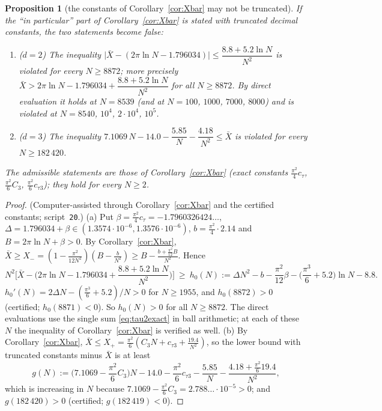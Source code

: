\documentclass[11pt,a4paper]{article}
\newcommand{\Xb}{\bar X}
\theoremstyle{plain}
\newtheorem{proposition}[theorem]{Proposition}
\theoremstyle{definition}
\numberwithin{equation}{section}
\begin{document}
\begin{proposition}[the constants of Corollary~\ref{cor:Xbar} may not be truncated]\label{prop:roundedfalse}
If the ``in particular'' part of Corollary~\ref{cor:Xbar} is stated with truncated decimal constants, the two statements become false:
\begin{enumerate}
\item[(a)] ($d=2$) The inequality $\big|\Xb-(2\pi\ln N-1.796034)\big|\le\dfrac{8.8+5.2\ln N}{N^2}$ is violated for every $N\ge8872$; more precisely
$\Xb>2\pi\ln N-1.796034+\dfrac{8.8+5.2\ln N}{N^2}$ for all $N\ge8872$. By direct evaluation it holds at $N=8539$ (and at $N=100$, $1000$, $7000$, $8000$) and is violated at $N=8540$, $10^4$, $2\cdot10^4$, $10^5$.
\item[(b)] ($d=3$) The inequality $7.1069\,N-14.0-\dfrac{5.85}{N}-\dfrac{4.18}{N^2}\le\Xb$ is violated for every $N\ge182\,420$.
\end{enumerate}
The admissible statements are those of Corollary~\ref{cor:Xbar} (exact constants $\frac{\pi^2}4c_\tau$, $\frac{\pi^2}{6}C_3$, $\frac{\pi^2}6c_{\tau3}$); they hold for every $N\ge2$.
\end{proposition}
\begin{proof}
(Computer-assisted through Corollary~\ref{cor:Xbar} and the certified constants; script~\texttt{20}.)
(a) Put $\beta=\frac{\pi^2}{4}c_\tau=-1.7960326424\ldots$, $\Delta=1.796034+\beta\in(1.3574\cdot10^{-6},1.3576\cdot10^{-6})$, $b=\frac{\pi^2}4\cdot2.14$ and $B=2\pi\ln N+\beta>0$. By Corollary~\ref{cor:Xbar}, $\Xb\ge X_-=(1-\frac{\pi^2}{12N^2})(B-\frac b{N^2})\ge B-\frac{b+\frac{\pi^2}{12}B}{N^2}$. Hence
\[
N^2\Big[\Xb-\Big(2\pi\ln N-1.796034+\frac{8.8+5.2\ln N}{N^2}\Big)\Big]\ \ge\ h_0(N):=\Delta N^2-b-\frac{\pi^2}{12}\beta-\Big(\frac{\pi^3}6+5.2\Big)\ln N-8.8 .
\]
$h_0'(N)=2\Delta N-(\frac{\pi^3}6+5.2)/N>0$ for $N\ge1955$, and $h_0(8872)>0$ (certified; $h_0(8871)<0$). So $h_0(N)>0$ for all $N\ge8872$. The direct evaluations use the single sum \eqref{eq:tau2exact} in ball arithmetic; at each of these $N$ the inequality of Corollary~\ref{cor:Xbar} is verified as well.
(b) By Corollary~\ref{cor:Xbar}, $\Xb\le X_+=\frac{\pi^2}{6}(C_3N+c_{\tau3}+\frac{19.4}{N^2})$, so the lower bound with truncated constants minus $\Xb$ is at least
\[
g(N):=\Big(7.1069-\frac{\pi^2}{6}C_3\Big)N-14.0-\frac{\pi^2}{6}c_{\tau3}-\frac{5.85}{N}-\frac{4.18+\frac{\pi^2}{6}19.4}{N^2},
\]
which is increasing in $N$ because $7.1069-\frac{\pi^2}6C_3=2.788\ldots\cdot10^{-5}>0$; and $g(182\,420)>0$ (certified; $g(182\,419)<0$).
\end{proof}
\end{document}
